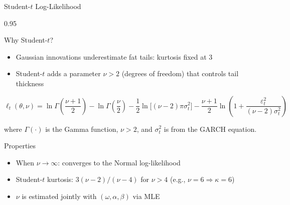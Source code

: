 \documentclass[9pt, aspectratio=169, t]{beamer}
\begin{document}
\begin{frame}{Student-$t$ Log-Likelihood}
    \begin{cminipage}{0.95\textwidth}
    {\footnotesize
        \begin{block}{Why Student-$t$?}
            \begin{itemize}\setlength{\itemsep}{0pt}
                \item Gaussian innovations underestimate fat tails: kurtosis fixed at 3
                \item Student-$t$ adds a parameter $\nu > 2$ (degrees of freedom) that controls tail thickness
            \end{itemize}
        \end{block}
        \vspace{-1mm}
        \begin{defn}
            \vspace{-2mm}
            \[
                \ell_t(\theta, \nu) = \ln\Gamma\!\left(\frac{\nu+1}{2}\right) - \ln\Gamma\!\left(\frac{\nu}{2}\right) - \frac{1}{2}\ln\bigl[(\nu-2)\pi\sigma_t^2\bigr] - \frac{\nu+1}{2}\ln\!\left(1 + \frac{\varepsilon_t^2}{(\nu-2)\sigma_t^2}\right)
            \]
            \vspace{-2mm}

            where $\Gamma(\cdot)$ is the Gamma function, $\nu > 2$, and $\sigma_t^2$ is from the GARCH equation.
        \end{defn}
        \vspace{-1mm}
        \begin{alertblock}{Properties}
            \begin{itemize}\setlength{\itemsep}{0pt}
                \item When $\nu \to \infty$: converges to the Normal log-likelihood
                \item Student-$t$ kurtosis: $3(\nu-2)/(\nu-4)$ for $\nu > 4$ (e.g., $\nu = 6 \Rightarrow \kappa = 6$)
                \item $\nu$ is estimated jointly with $(\omega, \alpha, \beta)$ via MLE
            \end{itemize}
        \end{alertblock}
    }
    \end{cminipage}
\end{frame}
\end{document}

